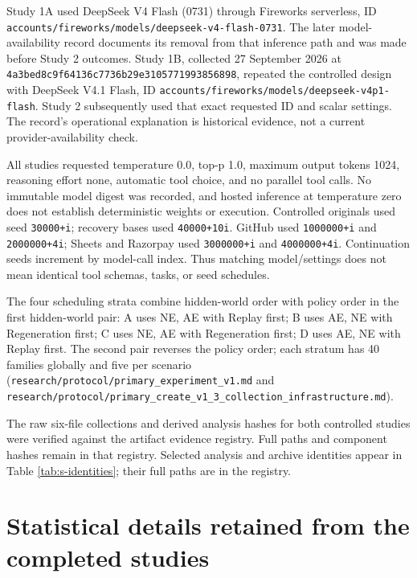\documentclass[conference]{IEEEtran}
\newcommand{\codeurl}[1]{{\def\UrlFont{\ttfamily}\nolinkurl{#1}}}
\begin{document}
{\raggedright Study 1A used DeepSeek V4 Flash (0731) through Fireworks serverless, ID \codeurl{accounts/fireworks/models/deepseek-v4-flash-0731}. The later model-availability record documents its removal from that inference path and was made before Study 2 outcomes. Study 1B, collected 27 September 2026 at \codeurl{4a3bed8c9f64136c7736b29e3105771993856898}, repeated the controlled design with DeepSeek V4.1 Flash, ID \codeurl{accounts/fireworks/models/deepseek-v4p1-flash}. Study 2 subsequently used that exact requested ID and scalar settings. The record's operational explanation is historical evidence, not a current provider-availability check.\par}


{\raggedright All studies requested temperature 0.0, top-p 1.0, maximum output tokens 1024, reasoning effort none, automatic tool choice, and no parallel tool calls. No immutable model digest was recorded, and hosted inference at temperature zero does not establish deterministic weights or execution. Controlled originals used seed \codeurl{30000+i}; recovery bases used \codeurl{40000+10i}. GitHub used \codeurl{1000000+i} and \codeurl{2000000+4i}; Sheets and Razorpay used \codeurl{3000000+i} and \codeurl{4000000+4i}. Continuation seeds increment by model-call index. Thus matching model/settings does not mean identical tool schemas, tasks, or seed schedules.\par}


{\raggedright The four scheduling strata combine hidden-world order with policy order in the first hidden-world pair: A uses NE, AE with Replay first; B uses AE, NE with Regeneration first; C uses NE, AE with Regeneration first; D uses AE, NE with Replay first. The second pair reverses the policy order; each stratum has 40 families globally and five per scenario (\codeurl{research/protocol/primary_experiment_v1.md} and \codeurl{research/protocol/primary_create_v1_3_collection_infrastructure.md}).\par}


The raw six-file collections and derived analysis hashes for both controlled studies were verified against the artifact evidence registry. Full paths and component hashes remain in that registry. Selected analysis and archive identities appear in Table \ref{tab:s-identities}; their full paths are in the registry.




\section{Statistical details retained from the completed studies}
\end{document}
